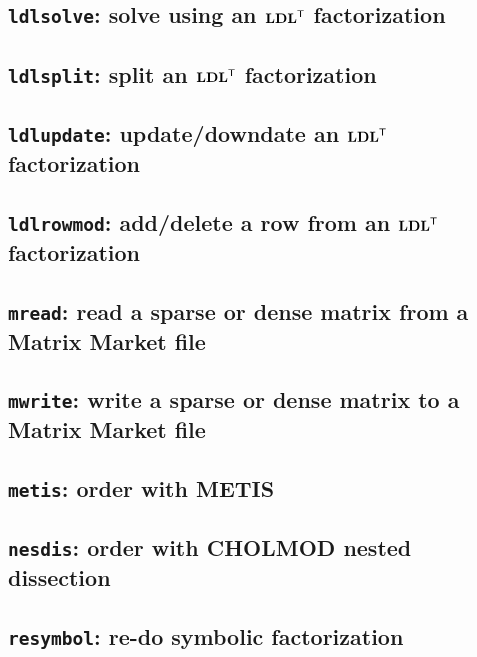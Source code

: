 \documentclass[11pt]{article}
\newcommand{\m}[1]{{\bf{#1}}}       %
\newcommand{\tr}{^{\sf T}}          %
\begin{document}
\subsection{{\tt ldlsolve}: solve using an $\m{LDL}\tr$ factorization}


\subsection{{\tt ldlsplit}: split an $\m{LDL}\tr$ factorization}


\subsection{{\tt ldlupdate}: update/downdate an $\m{LDL}\tr$ factorization}


\subsection{{\tt ldlrowmod}: add/delete a row from an $\m{LDL}\tr$
factorization}


\subsection{{\tt mread}: read a sparse or dense matrix from a Matrix Market
file}


\subsection{{\tt mwrite}: write a sparse or dense matrix to a Matrix Market
file}


\subsection{{\tt metis}: order with METIS}


\subsection{{\tt nesdis}: order with CHOLMOD nested dissection}


\subsection{{\tt resymbol}: re-do symbolic factorization}

\end{document}
